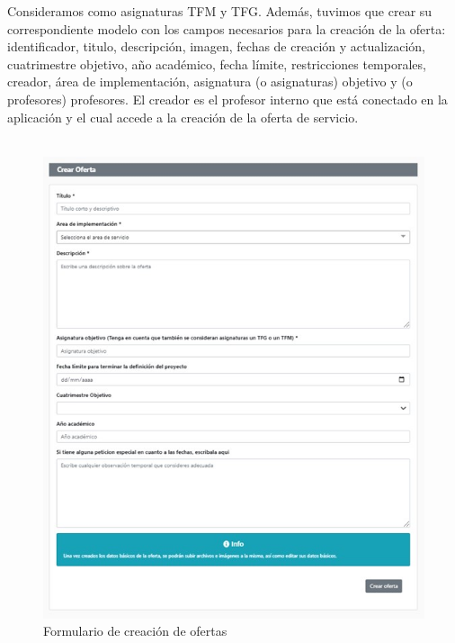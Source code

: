 \documentclass[11pt]{book}
\begin{document}
	Consideramos como asignaturas TFM y TFG.
	Además, tuvimos que crear su correspondiente modelo con los campos necesarios para la creación de la oferta: identificador, titulo, descripción, imagen, fechas de creación y actualización, cuatrimestre objetivo, año académico, fecha límite, restricciones temporales, creador, área de implementación, asignatura (o asignaturas) objetivo y (o profesores) profesores. El creador es el profesor interno que está conectado en la aplicación y el cual accede a la creación de la oferta de servicio.\\\\
	
	
	\begin{figure}[t]
		\centering
		\includegraphics[scale=1.1]{oferta}
		\caption{Formulario de creación de ofertas}
	\end{figure}
\end{document}
